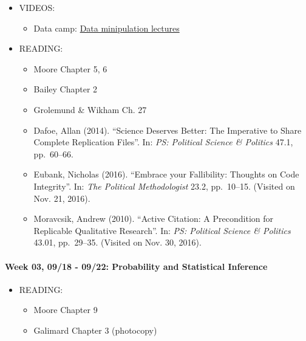 \documentclass[11pt,]{article}
\providecommand{\tightlist}{%
  \setlength{\itemsep}{0pt}\setlength{\parskip}{0pt}}
\begin{document}
\begin{itemize}
\tightlist
\item
  VIDEOS:

  \begin{itemize}
  \tightlist
  \item
    Data camp:
    \href{https://www.datacamp.com/courses/dplyr-data-manipulation-r-tutorial}{Data
    minipulation lectures}
  \end{itemize}
\item
  READING:

  \begin{itemize}
  \item
    Moore Chapter 5, 6
  \item
    Bailey Chapter 2
  \item
    Grolemund \& Wikham Ch. 27
  \item
     Dafoe, Allan (2014). ``Science Deserves Better:
    The Imperative to Share Complete Replication Files''. In:
    \emph{PS: Political Science \& Politics} 47.1, pp.~60--66.
  \item
     Eubank, Nicholas (2016). ``Embrace your
    Fallibility: Thoughts on Code Integrity''. In:
    \emph{The Political Methodologist} 23.2, pp.~10--15. (Visited on
    Nov. 21, 2016).
  \item
     Moravcsik, Andrew (2010). ``Active Citation: A
    Precondition for Replicable Qualitative Research''. In:
    \emph{PS: Political Science \& Politics} 43.01, pp.~29--35. (Visited
    on Nov. 30, 2016).
  \end{itemize}
\end{itemize}

\paragraph{Week 03, 09/18 - 09/22: Probability and Statistical
Inference}\label{week-03-0918---0922-probability-and-statistical-inference}

\begin{itemize}
\tightlist
\item
  READING:

  \begin{itemize}
  \tightlist
  \item
    Moore Chapter 9
  \item
    Galimard Chapter 3 (photocopy)
  \end{itemize}
\end{itemize}
\end{document}
